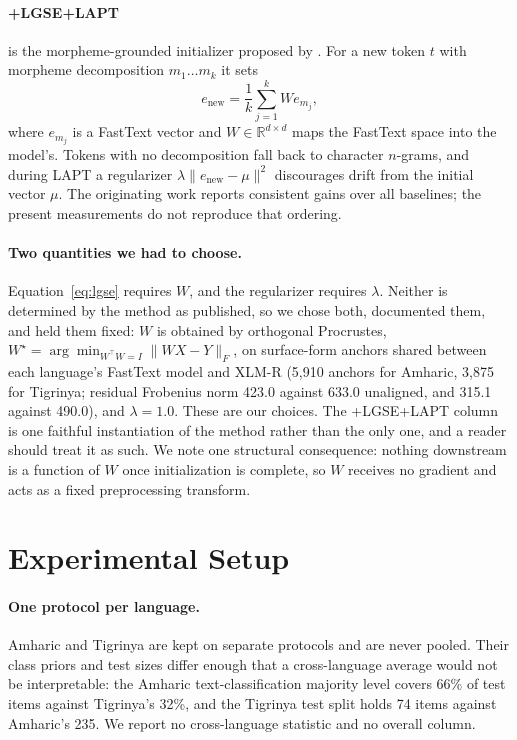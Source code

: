\documentclass[11pt]{article}
\begin{document}
\paragraph{+LGSE+LAPT} is the morpheme-grounded initializer proposed by
\citet{teklehaymanot-etal-2026-lgse}. For a new token $t$ with morpheme
decomposition $m_1 \dots m_k$ it sets
\begin{equation}
e_{\text{new}} = \frac{1}{k}\sum_{j=1}^{k} W e_{m_j},
\label{eq:lgse}
\end{equation}
where $e_{m_j}$ is a FastText vector and $W \in \mathbb{R}^{d \times d}$
maps the FastText space into the model's. Tokens with no decomposition fall
back to character $n$-grams, and during LAPT a regularizer
$\lambda \lVert e_{\text{new}} - \mu \rVert^2$ discourages drift from the
initial vector $\mu$. The originating work reports consistent gains over all
baselines; the present measurements do not reproduce that ordering.

\paragraph{Two quantities we had to choose.}
Equation~\ref{eq:lgse} requires $W$, and the regularizer requires $\lambda$.
Neither is determined by the method as published, so we chose both,
documented them, and held them fixed: $W$ is obtained by orthogonal
Procrustes, $W^\star = \arg\min_{W^\top W = I}\lVert WX - Y \rVert_F$, on
surface-form anchors shared between each language's FastText model and
XLM-R (5{,}910 anchors for Amharic, 3{,}875 for Tigrinya; residual Frobenius
norm 423.0 against 633.0 unaligned, and 315.1 against 490.0), and
$\lambda = 1.0$. These are our choices. The +LGSE+LAPT column is one faithful
instantiation of the method rather than the only one, and a reader should
treat it as such. We note one structural consequence: nothing downstream is a
function of $W$ once initialization is complete, so $W$ receives no gradient
and acts as a fixed preprocessing transform.

\section{Experimental Setup}
\label{sec:setup}

\paragraph{One protocol per language.} Amharic and Tigrinya are kept on
separate protocols and are never pooled. Their class priors and test sizes
differ enough that a cross-language average would not be interpretable: the
Amharic text-classification majority level covers 66\% of test items against
Tigrinya's 32\%, and the Tigrinya test split holds 74 items against Amharic's
235. We report no cross-language statistic and no overall column.
\end{document}
